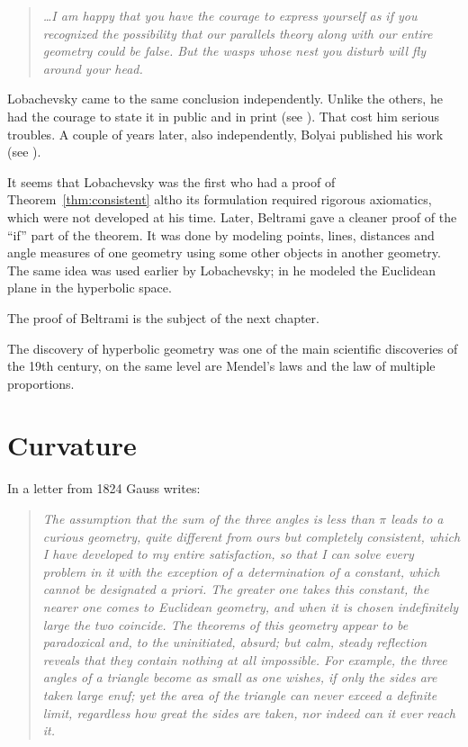\smallskip

\begin{quotation}{\it
\dots I am happy that you have the courage to express yourself as if you recognized the possibility
that our parallels theory along with our entire geometry could be false. But the wasps whose
nest you disturb will fly around your head.}
\end{quotation}

\smallskip

Lobachevsky came to the same conclusion independently.
Unlike the others, he had the courage to state it in public and in print (see \cite{lobachevsky}).
That cost him serious troubles.
A couple of years later, also independently, Bolyai published his work (see \cite{bolyai}).

It seems that Lobachevsky was the first who had a proof of Theorem~\ref{thm:consistent} altho its formulation required rigorous axiomatics, which were not developed at his time.
Later, Beltrami gave a cleaner proof of the ``if'' part of the theorem.
It was done by modeling points, lines, distances and angle measures of one geometry using some other objects in another geometry.
The same idea was used earlier by Lobachevsky; 
in \cite[34]{lobachevsky-1840} he modeled the Euclidean plane in the hyperbolic space.

The proof of Beltrami is the subject of the next chapter. 

\medskip

The discovery of hyperbolic geometry was one of the main scientific discoveries of the 19th century, on the same level are Mendel's laws and the law of multiple proportions.

\section*{Curvature}
In a letter from 1824 Gauss writes: 

\begin{quotation}{\it
The assumption that the sum of the three angles is less than $\pi$ leads to a curious geometry, 
quite different from ours but completely consistent, 
which I have developed to my entire satisfaction, 
so that I can solve every problem in it with the exception of a determination of a constant, which cannot be designated a priori. 
The greater one takes this constant, the nearer one comes to Euclidean geometry, 
and when it is chosen indefinitely large the two coincide.
The theorems of this geometry appear to be paradoxical and, 
to the uninitiated, absurd; but calm, steady reflection reveals that they contain nothing at all impossible. 
For example, the three angles of a triangle become as small as one wishes, if only the sides are taken large enuf; 
yet the area of the triangle can never exceed a definite limit, regardless how great the sides are taken, 
nor indeed can it ever reach it.}
\end{quotation} 

